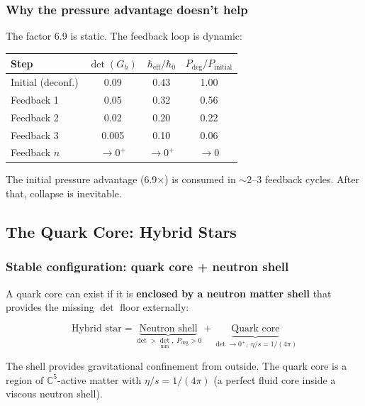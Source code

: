\documentclass[12pt]{article}
\theoremstyle{remark}
\theoremstyle{definition}
\newcommand{\CC}{\mathbb{C}}
\begin{document}
\subsubsection{Why the pressure advantage doesn't help}

The factor 6.9 is static. The feedback loop is dynamic:

\begin{center}
\begin{tabular}{lccc}
\hline
Step & $\det(G_h)$ & $\hbar_\text{eff}/\hbar_0$ & $P_\text{deg}/P_\text{initial}$ \\
\hline
Initial (deconf.) & 0.09 & 0.43 & 1.00 \\
Feedback 1 & 0.05 & 0.32 & 0.56 \\
Feedback 2 & 0.02 & 0.20 & 0.22 \\
Feedback 3 & 0.005 & 0.10 & 0.06 \\
Feedback $n$ & $\to 0^+$ & $\to 0^+$ & $\to 0$ \\
\hline
\end{tabular}
\end{center}

The initial pressure advantage (6.9$\times$) is consumed in $\sim$2--3 feedback cycles. After that, collapse is inevitable.

\subsection{The Quark Core: Hybrid Stars}

\subsubsection{Stable configuration: quark core + neutron shell}

A quark core can exist if it is \textbf{enclosed by a neutron matter shell} that provides the missing $\det$ floor externally:

\begin{equation}
\text{Hybrid star} = \underbrace{\text{Neutron shell}}_{\det > \det_\text{min},\; P_\text{deg} > 0} + \underbrace{\text{Quark core}}_{\det \to 0^+,\; \eta/s = 1/(4\pi)}
\end{equation}

The shell provides gravitational confinement from outside. The quark core is a region of $\CC^5$-active matter with $\eta/s = 1/(4\pi)$ (a perfect fluid core inside a viscous neutron shell).
\end{document}

